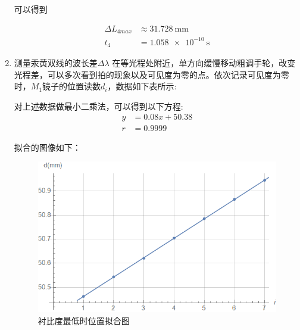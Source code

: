 \documentclass[a4paper]{article}
\begin{document}
\begin{changemargin}{1cm}{1cm}
\begin{spacing}{1.6}
\begin{enumerate}
              可以得到

              $$\begin{aligned}
                      \Delta L_{4max} & \approx \SI{31.728}{\mm} \\
                      t_4             & =\SI{1.058e-10}{\s}
                  \end{aligned}$$

        \item 测量汞黄双线的波长差$\Delta\lambda$
              在等光程处附近，单方向缓慢移动粗调手轮，改变光程差，可以多次看到拍的现象以及可见度为零的点。依次记录可见度为零时，$M_1$镜子的位置读数$d_i$，数据如下表所示:

              \begin{table}[htbp]
                  \centering
                  \captionsetup{justification=centering,margin=2cm}
                  \caption{\label{tab:tab_data2}衬比度为最低时位置实验数据表}
              \end{table}\par

              对上述数据做最小二乘法，可以得到以下方程:
              $$\begin{aligned}
                      y & = 0.08x+50.38 \\
                      r & =0.9999
                  \end{aligned}$$

              拟合的图像如下：

              \begin{figure}[htbp]
                  \centering
                  \captionsetup{justification=centering,margin=2cm}
                  \includegraphics[width=110mm]{fig1.png}
                  \caption{\label{fig:1}衬比度最低时位置拟合图}
              \end{figure}


\end{enumerate}
\end{spacing}
\end{changemargin}
\end{document}
